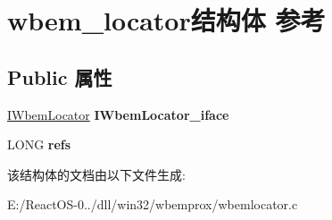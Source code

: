 \hypertarget{structwbem__locator}{}\section{wbem\+\_\+locator结构体 参考}
\label{structwbem__locator}
\subsection*{Public 属性}
\begin{DoxyCompactItemize}
\item 
\mbox{\label{structwbem__locator_a85e1a5e68fdd4df6d7e34276f07619a5}} 
\hyperlink{interface_i_wbem_locator}{I\+Wbem\+Locator} {\bfseries I\+Wbem\+Locator\+\_\+iface}
\item 
\mbox{\label{structwbem__locator_ad8970d6a10151cb20143c85b6ddcf3de}} 
L\+O\+NG {\bfseries refs}
\end{DoxyCompactItemize}


该结构体的文档由以下文件生成\+:\begin{DoxyCompactItemize}
\item 
E\+:/\+React\+O\+S-\/0../dll/win32/wbemprox/wbemlocator.\+c\end{DoxyCompactItemize}

